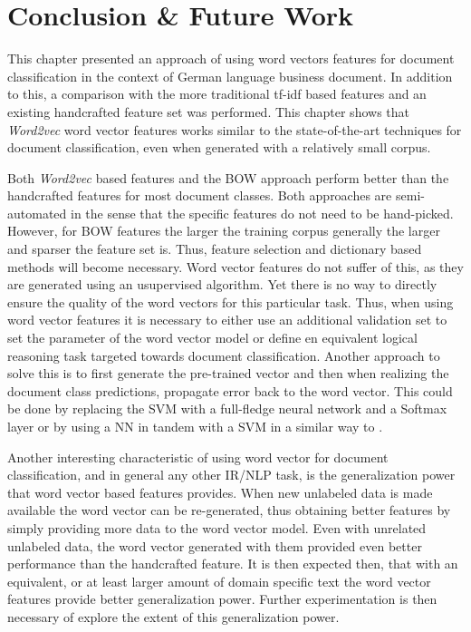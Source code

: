 



\section{Conclusion \& Future Work}
\label{sec:w2v4tc_conclusion}

This chapter presented an approach  of using  word vectors features for
document classification in the context of German language business document.
In addition to this,  a comparison with the more
traditional \ac{tf-idf}  based features and an existing handcrafted
feature set was performed. This chapter shows that \textit{Word2vec} word
vector features works similar to the state-of-the-art techniques for document
classification, even when generated  with a relatively small corpus.

Both \textit{Word2vec} based features and the \ac{BOW} approach perform
better than the handcrafted features for most document classes. Both
 approaches are semi-automated in the sense that the specific
features do not need to be hand-picked. However, for \ac{BOW} features the larger the training
corpus generally the larger and sparser the feature set is. Thus, feature
selection and dictionary based methods will become  necessary.
Word vector features do not suffer of this, as they are  generated using an usupervised
algorithm. Yet there is no way to directly ensure the quality of the word
vectors for this particular task. Thus, when using  word vector
features it is necessary to either  use an additional validation set  to set
the parameter of the word vector model or define en equivalent logical
reasoning task targeted towards document
classification.   Another approach to solve this is to first generate the pre-trained vector
and then when realizing the document class predictions, propagate error back
to the word vector. This could be done by replacing the \ac{SVM} with a
full-fledge neural network and a Softmax layer or by using a \ac{NN} in tandem with a \ac{SVM} in a
similar way to \cite{DBLP:journals/corr/Tang13}.


Another interesting characteristic of using word vector for document
classification, and in general any other \ac{IR}/\ac{NLP} task,  is the
generalization power that word vector based features provides.
When new unlabeled data is made available the word vector can be
re-generated, thus obtaining better features by simply providing more data to
the word vector model. Even with unrelated  unlabeled data, the word vector
generated with them provided even better performance than the handcrafted
feature. It is then expected then, that with an equivalent, or at least larger
amount of domain specific text the word vector features provide better
generalization power. Further experimentation is then necessary  of
explore the extent of this generalization power.

